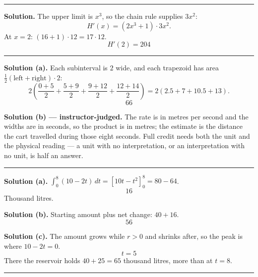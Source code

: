 \documentclass[12pt]{article}
\begin{document}
\vspace{0.15cm}\noindent\rule{\linewidth}{0.2pt}


\textbf{Solution.} The upper limit is $x^3$, so the chain rule supplies $3x^2$:
\[ H'(x) = \left(2x^3 + 1\right)\cdot 3x^2 . \]
At $x = 2$: $\left(16 + 1\right)\cdot 12 = 17\cdot 12$.
\[ \boxed{H'(2) = 204} \]

\vspace{0.15cm}\noindent\rule{\linewidth}{0.2pt}


\textbf{Solution (a).} Each subinterval is $2$ wide, and each trapezoid has area
$\tfrac{1}{2}(\text{left} + \text{right})\cdot 2$:
\[ 2\left(\frac{0+5}{2} + \frac{5+9}{2} + \frac{9+12}{2} + \frac{12+14}{2}\right)
   = 2\left(2.5 + 7 + 10.5 + 13\right). \]
\[ \boxed{66} \]

\textbf{Solution (b) --- instructor-judged.} The rate is in metres per second
and the widths are in seconds, so the product is in metres; the estimate is the
distance the cart travelled during those eight seconds. Full credit needs both
the unit and the physical reading --- a unit with no interpretation, or an
interpretation with no unit, is half an answer.

\vspace{0.15cm}\noindent\rule{\linewidth}{0.2pt}


\textbf{Solution (a).} $\int_0^8 (10 - 2t)\,dt
= \left[10t - t^2\right]_0^8 = 80 - 64$.
\[ \boxed{16} \]
Thousand litres.

\textbf{Solution (b).} Starting amount plus net change: $40 + 16$.
\[ \boxed{56} \]

\textbf{Solution (c).} The amount grows while $r > 0$ and shrinks after, so the
peak is where $10 - 2t = 0$.
\[ \boxed{t = 5} \]
There the reservoir holds $40 + 25 = 65$ thousand litres, more than at $t = 8$.

\vspace{0.15cm}\noindent\rule{\linewidth}{0.2pt}

\end{document}
